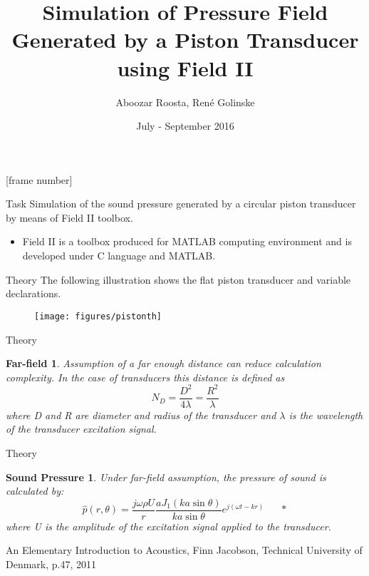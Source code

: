 \documentclass{beamer}
\title{Simulation of Pressure Field Generated by a Piston Transducer using Field II}
\date{July - September 2016}
\institute{BTU Cottbus-Senftenberg}
\author{Aboozar Roosta, Ren\'{e} Golinske}
\begin{document}
\begin{frame}
\titlepage\thispagestyle{empty}
\end{frame}

[frame number]
% 
\begin{frame}{Task}
Simulation of the sound pressure generated by a circular piston transducer by means of Field II toolbox.

\begin{itemize}
 
\item Field II is a toolbox produced for MATLAB computing environment and is developed under C language and MATLAB.
\end{itemize}
\end{frame}

\begin{frame}{Theory}
The following illustration shows the flat piston transducer and variable declarations.
\begin{figure}
\texttt{[image: figures/pistonth]}
\end{figure}

\end{frame}

\begin{frame}{Theory}
\newtheorem{farfield}{Far-field}
\begin{farfield}
Assumption of a far enough distance can reduce calculation complexity. In the case of transducers this distance is defined as
$$N_D=\frac{D^2}{4\lambda}=\frac{R^2}{\lambda}$$
where D and R are diameter and radius of the transducer and $\lambda$ is the wavelength of the transducer excitation signal.
\end{farfield}
\end{frame}


\begin{frame}{Theory}
\newtheorem{pressurefield}{Sound Pressure}
\begin{pressurefield}
Under far-field assumption, the pressure of sound is calculated by:
$$\hat{p}(r,\theta)=\frac{j\omega\rho U}{r}\frac{aJ_1(ka\sin\theta)}{ka\sin\theta}e^{j(\omega t-kr)}\ \ \  \ \ \ \     *$$
where U is the amplitude of the excitation signal applied to the transducer.
\end{pressurefield}
{\tiny * An Elementary Introduction to Acoustics, Finn Jacobson, Technical University of Denmark, p.47, 2011} 
\end{frame}
\end{document}
